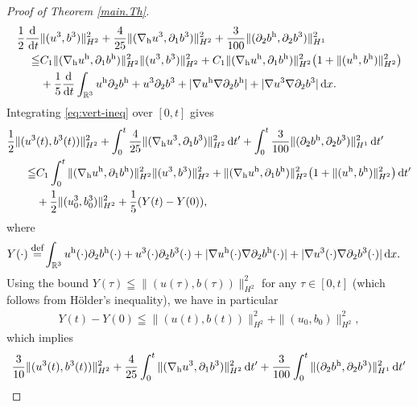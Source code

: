 \documentclass[11pt]{amsart}
\theoremstyle{definition}
\newcommand{\R}{\mathbb{R}}
\def\eqdefa{\buildrel\hbox{\footnotesize def}\over =}
\newcommand{\dx}{\,{\rm d}x}
\newcommand{\dt}{\,{\rm d}t}
\numberwithin{equation}{section}
\begin{document}
\begin{proof}[Proof of Theorem \ref{main.Th}]
	\begin{align}\label{eq:vert-ineq}
		\frac12 \frac{\mathrm{d}}{\dt}&\|(u^3,b^3)\|^2_{H^2}+\frac{4}{25}\|(\nabla_{\mathrm{h}} u^3,\partial_1b^3)\|_{H^2}^2+\frac{3}{100}\|(\partial_2b^\mathrm{h},\partial_2b^3)\|_{H^1}^2\nonumber\\
		\leqq&C_1\|(\nabla_{\mathrm{h}} u^\mathrm{h},\partial_1b^\mathrm{h})\|_{H^{2}}^2\|(u^3,b^3)\|_{H^2}^2+C_1\|(\nabla_{\mathrm{h}} u^\mathrm{h},\partial_{1}b^\mathrm{h})\|_{H^{2}}^2\bigl(1+\|( u^\mathrm{h}, b^\mathrm{h})\|_{H^2}^2\bigr) \nonumber\\
		&+\frac{1}{5}\frac{\mathrm{d}}{\mathrm{d}t}\int_{\R^3}u^\mathrm{h}\partial_2 b^\mathrm{h}+u^3\partial_2 b^3+|\nabla u^\mathrm{h}\nabla\partial_{2}b^\mathrm{h}|+|\nabla u^3\nabla\partial_{2}b^3|\dx.
	\end{align}
	Integrating \eqref{eq:vert-ineq} over $[0,t]$ gives
	\begin{align}
		\frac12 \|(u^3&(t),b^3(t))\|^2_{H^2}+\int_{0}^{t}\frac{4}{25}\|(\nabla_{\mathrm{h}} u^3,\partial_1b^3)\|_{H^2}^2\dt'+\int_{0}^{t}\frac{3}{100}\|(\partial_2b^\mathrm{h},\partial_2b^3)\|_{H^1}^2\dt'\nonumber\\
		\leqq&C_1\int_{0}^{t}\|(\nabla_{\mathrm{h}} u^\mathrm{h},\partial_1b^\mathrm{h})\|_{H^{2}}^2\|(u^3,b^3)\|_{H^2}^2+\|(\nabla_{\mathrm{h}} u^\mathrm{h},\partial_{1}b^\mathrm{h})\|_{H^{2}}^2\bigl(1+\|( u^\mathrm{h}, b^\mathrm{h})\|_{H^2}^2\bigr)\dt'\nonumber\\
		&+\frac12\|(u^3_0,b^3_0)\|^2_{H^2}+\frac{1}{5}(Y(t)-Y(0)),
	\end{align}
	where
	\begin{align*}
		Y(\cdot)\eqdefa& \int_{\R^3}u^\mathrm{h}(\cdot)\partial_2 b^\mathrm{h}(\cdot)+u^3(\cdot)\partial_2 b^3(\cdot)+|\nabla u^\mathrm{h}(\cdot)\nabla\partial_{2}b^\mathrm{h}(\cdot)|+|\nabla u^3(\cdot)\nabla\partial_{2}b^3(\cdot)|\dx.
	\end{align*}
	Using the bound $Y(\tau) \leqq \|(u(\tau),b(\tau))\|_{H^2}^2$ for any $\tau \in [0,t]$ (which follows from Hölder's inequality), we have in particular
	\begin{align*}
		Y(t) - Y(0) \leqq\|(u(t),b(t))\|_{H^2}^2 + \|(u_0,b_0)\|_{H^2}^2,
	\end{align*}
	which implies
	\begin{align*}
		\frac{3}{10}\|(u^3(t)&,b^3(t))\|^2_{H^2}+\frac{4}{25}\int_{0}^{t}\|(\nabla_{\mathrm{h}} u^3,\partial_1b^3)\|_{H^2}^2\dt'+\frac{3}{100}\int_{0}^{t}\|(\partial_2b^\mathrm{h},\partial_2b^3)\|_{H^1}^2\dt'\\

\end{align*}
\end{proof}
\end{document}
